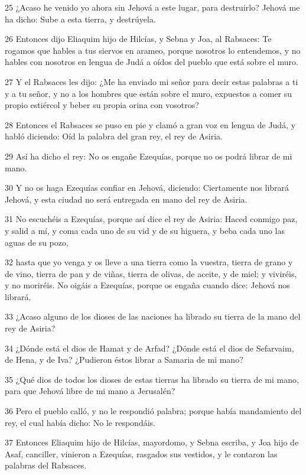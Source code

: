 \par 25 ¿Acaso he venido yo ahora sin Jehová a este lugar, para destruirlo? Jehová me ha dicho: Sube a esta tierra, y destrúyela.
\par 26 Entonces dijo Eliaquim hijo de Hilcías, y Sebna y Joa, al Rabsaces: Te rogamos que hables a tus siervos en arameo, porque nosotros lo entendemos, y no hables con nosotros en lengua de Judá a oídos del pueblo que está sobre el muro.
\par 27 Y el Rabsaces les dijo: ¿Me ha enviado mi señor para decir estas palabras a ti y a tu señor, y no a los hombres que están sobre el muro, expuestos a comer su propio estiércol y beber su propia orina con vosotros?
\par 28 Entonces el Rabsaces se puso en pie y clamó a gran voz en lengua de Judá, y habló diciendo: Oíd la palabra del gran rey, el rey de Asiria.
\par 29 Así ha dicho el rey: No os engañe Ezequías, porque no os podrá librar de mi mano.
\par 30 Y no os haga Ezequías confiar en Jehová, diciendo: Ciertamente nos librará Jehová, y esta ciudad no será entregada en mano del rey de Asiria.
\par 31 No escuchéis a Ezequías, porque así dice el rey de Asiria: Haced conmigo paz, y salid a mí, y coma cada uno de su vid y de su higuera, y beba cada uno las aguas de su pozo,
\par 32 hasta que yo venga y os lleve a una tierra como la vuestra, tierra de grano y de vino, tierra de pan y de viñas, tierra de olivas, de aceite, y de miel; y viviréis, y no moriréis. No oigáis a Ezequías, porque os engaña cuando dice: Jehová nos librará.
\par 33 ¿Acaso alguno de los dioses de las naciones ha librado su tierra de la mano del rey de Asiria?
\par 34 ¿Dónde está el dios de Hamat y de Arfad? ¿Dónde está el dios de Sefarvaim, de Hena, y de Iva? ¿Pudieron éstos librar a Samaria de mi mano?
\par 35 ¿Qué dios de todos los dioses de estas tierras ha librado su tierra de mi mano, para que Jehová libre de mi mano a Jerusalén?
\par 36 Pero el pueblo calló, y no le respondió palabra; porque había mandamiento del rey, el cual había dicho: No le respondáis.
\par 37 Entonces Eliaquim hijo de Hilcías, mayordomo, y Sebna escriba, y Joa hijo de Asaf, canciller, vinieron a Ezequías, rasgados sus vestidos, y le contaron las palabras del Rabsaces.

